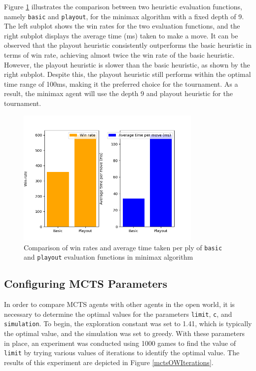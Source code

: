 Figure \ref{minimaxOWEval} illustrates the comparison between two heuristic evaluation functions, namely \texttt{basic} and \texttt{playout}, for the minimax algorithm with a fixed depth of 9. The left subplot shows the win rates for the two evaluation functions, and the right subplot displays the average time (ms) taken to make a move. It can be observed that the playout heuristic consistently outperforms the basic heuristic in terms of win rate, achieving almost twice the win rate of the basic heuristic. However, the playout heuristic is slower than the basic heuristic, as shown by the right subplot. Despite this, the playout heuristic still performs within the optimal time range of 100ms, making it the preferred choice for the tournament. As a result, the minimax agent will use the depth 9 and playout heuristic for the tournament.

\begin{figure}[h]
  \centering
  \captionsetup{justification=centering}
  \includegraphics[width=0.8\textwidth]{../img/minimax_eval_openworld.png}
  \caption{Comparison of win rates and average time taken per ply of \texttt{basic} and \texttt{playout} evaluation functions in minimax algorithm}
  \label{minimaxOWEval}
\end{figure}


\subsection{Configuring MCTS Parameters}

In order to compare MCTS agents with other agents in the open world, it is necessary to determine the optimal values for the parameters \texttt{limit}, \texttt{c}, and \texttt{simulation}. To begin, the exploration constant was set to 1.41, which is typically the optimal value, and the simulation was set to greedy. With these parameters in place, an experiment was conducted using 1000 games to find the value of \texttt{limit} by trying various values of iterations to identify the optimal value. The results of this experiment are depicted in Figure \ref{mctsOWIterations}.

